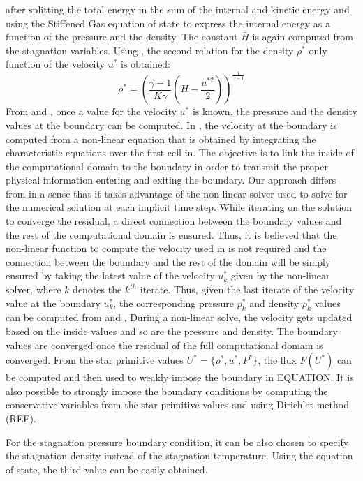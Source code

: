 after splitting the total energy in the sum of the internal and kinetic energy and using the Stiffened Gas equation of state to express the internal energy as a function of the pressure and the density. The constant $\bar{H}$ is again computed from the stagnation variables. Using , the second relation for the density $\rho^*$ only function of the velocity $u^*$ is obtained:
\begin{equation}\label{eq:scd_relation}
\rho^* = \left( \frac{\gamma-1}{K \gamma}(\bar{H}-\frac{u^{*2}}{2}) \right)^{\frac{1}{\gamma-1}}
\end{equation}
From  and , once a value for the velocity $u^*$ is known, the pressure and the density values at the boundary can be computed. In \cite{SEM}, the velocity at the boundary is computed from a non-linear equation that is obtained by integrating the characteristic equations over the first cell in. The objective is to link the inside of the computational domain to the boundary in order to transmit the proper physical information entering and exiting the boundary. Our approach differs from \cite{SEM} in a sense that it takes advantage of the non-linear solver used to solve for the numerical solution at each implicit time step. While iterating on the solution to converge the residual, a direct connection between the boundary values and the rest of the computational domain is ensured. Thus, it is believed that the non-linear function to compute the velocity used in \cite{SEM} is not required and the connection between the boundary and the rest of the domain will be simply ensured by taking the latest value of the velocity $u^*_k$ given by the non-linear solver, where $k$ denotes the $k^{th}$ iterate. Thus, given the last iterate of the velocity value at the boundary $u^*_k$, the corresponding pressure $p^*_k$ and density $\rho^*_k$ values can be computed from  and . During a non-linear solve, the velocity gets updated based on the inside values and so are the pressure and density. The boundary values are converged once the residual of the full computational domain is converged. From the star primitive values $U^* = \{\rho^*, u^*, P^* \}$, the flux $F(U^*)$ can be computed and then used to weakly impose the boundary in EQUATION. It is also possible to strongly impose the boundary conditions by computing the conservative variables from the star primitive values and using Dirichlet method (REF).
\begin{remark}[]
For the stagnation pressure boundary condition, it can be also chosen to specify the stagnation density instead of the stagnation temperature. Using the equation of state, the third value can be easily obtained. 
\end{remark}
